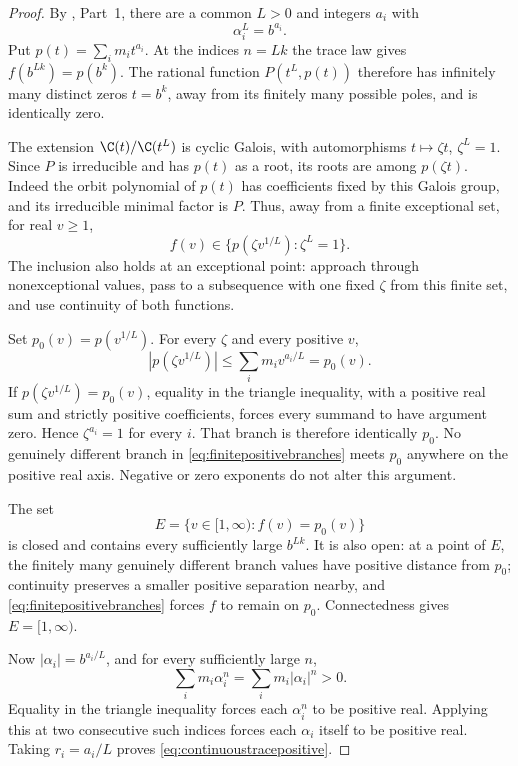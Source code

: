 \begin{proof}
By , Part~1, there are a common $L>0$ and
integers $a_i$ with
\[
 \alpha_i^L=b^{a_i}.
\]
Put $p(t)=\sum_i m_i t^{a_i}$.
At the indices $n=Lk$ the trace law gives
$f(b^{Lk})=p(b^k)$.
The rational function $P(t^L,p(t))$ therefore has
infinitely many distinct zeros $t=b^k$, away from its
finitely many possible poles, and is identically zero.

The extension $\C(t)/\C(t^L)$ is cyclic Galois, with
automorphisms $t\mapsto\zeta t$, $\zeta^L=1$.
Since $P$ is irreducible and has $p(t)$ as a root,
its roots are among $p(\zeta t)$.
Indeed the orbit polynomial of $p(t)$ has coefficients
fixed by this Galois group, and its irreducible minimal
factor is $P$.
Thus, away from a finite exceptional set, for real $v\ge1$,
\begin{equation}\label{eq:finitepositivebranches}
 f(v)\in\{p(\zeta v^{1/L}):\zeta^L=1\}.
\end{equation}
The inclusion also holds at an exceptional point:
approach through nonexceptional values, pass to a
subsequence with one fixed $\zeta$ from this finite set,
and use continuity of both functions.

Set $p_0(v)=p(v^{1/L})$.
For every $\zeta$ and every positive $v$,
\[
 |p(\zeta v^{1/L})|
 \le\sum_i m_i v^{a_i/L}=p_0(v).
\]
If $p(\zeta v^{1/L})=p_0(v)$, equality in the triangle
inequality, with a positive real sum and strictly
positive coefficients, forces every summand to have
argument zero. Hence $\zeta^{a_i}=1$ for every $i$.
That branch is therefore identically $p_0$.
No genuinely different branch in
\eqref{eq:finitepositivebranches} meets $p_0$ anywhere
on the positive real axis. Negative or zero exponents
do not alter this argument.

The set
\[
 E=\{v\in[1,\infty):f(v)=p_0(v)\}
\]
is closed and contains every sufficiently large
$b^{Lk}$. It is also open: at a point of $E$, the
finitely many genuinely different branch values have
positive distance from $p_0$; continuity preserves
a smaller positive separation nearby, and
\eqref{eq:finitepositivebranches} forces $f$ to remain
on $p_0$.
Connectedness gives $E=[1,\infty)$.

Now $|\alpha_i|=b^{a_i/L}$, and for every sufficiently
large $n$,
\[
 \sum_i m_i\alpha_i^n
   =\sum_i m_i|\alpha_i|^n>0.
\]
Equality in the triangle inequality forces each
$\alpha_i^n$ to be positive real. Applying this at two
consecutive such indices forces each $\alpha_i$ itself
to be positive real. Taking $r_i=a_i/L$ proves
\eqref{eq:continuoustracepositive}.


\end{proof}
